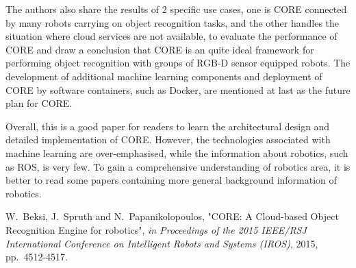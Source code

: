 \documentclass[]{article}
\begin{document}
The authors also share the results of 2 specific use cases, one is CORE connected by many robots carrying on object recognition tasks, and the other handles the situation where cloud services are not available, to evaluate the performance of CORE and draw a conclusion that CORE is an quite ideal framework for performing object recognition with groups of RGB-D sensor equipped robots. The development of additional machine learning components and deployment of CORE by software containers, such as Docker, are mentioned at last as the future plan for CORE.

Overall, this is a good paper for readers to learn the architectural design and detailed implementation of CORE. However, the technologies associated with machine learning are over-emphasised, while the information about robotics, such as ROS, is very few. To gain a comprehensive understanding of robotics area, it is better to read some papers containing more general background information of robotics.

\begin{thebibliography}{1}
		
		W.~Beksi, J.~Spruth and N.~Papanikolopoulos, "CORE: A Cloud-based Object Recognition Engine for robotics", \emph{in Proceedings of the 2015 IEEE/RSJ International Conference on Intelligent Robots and Systems (IROS)}, 2015, pp.~4512-4517.
		
\end{thebibliography}
\end{document}
